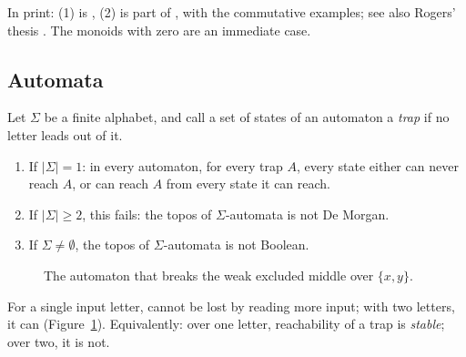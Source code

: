 \status{} In print: (1) is \cite[Thm~2.4]{hemelaer-rogers}, (2) is part of \cite[Thm~2.31]{hemelaer-rogers}, with the commutative examples; see also Rogers' thesis \cite{rogers-thesis}. The monoids with zero are an immediate case.

\subsection{Automata}

\begin{corollary}\label{co:automata}
Let $\Sigma$ be a finite alphabet, and call a set of states of an automaton a \emph{trap} if no letter leads out of it.
\begin{enumerate}
\item If $|\Sigma| = 1$: in every automaton, for every trap $A$, every state either can never reach $A$, or can reach $A$ from every state it can reach.
\item If $|\Sigma|\ge 2$, this fails: the topos of $\Sigma$-automata is not De Morgan.
\item If $\Sigma\neq\emptyset$, the topos of $\Sigma$-automata is not Boolean.
\end{enumerate}
\end{corollary}

\begin{figure}[ht]
\centering
{}
\caption{The automaton that breaks the weak excluded middle over $\{x,y\}$.}\label{fig:automaton}
\end{figure}

\inwords{} For a single input letter,  cannot be lost by reading more input; with two letters, it can (Figure~\ref{fig:automaton}). Equivalently: over one letter, reachability of a trap is \emph{stable}; over two, it is not.

